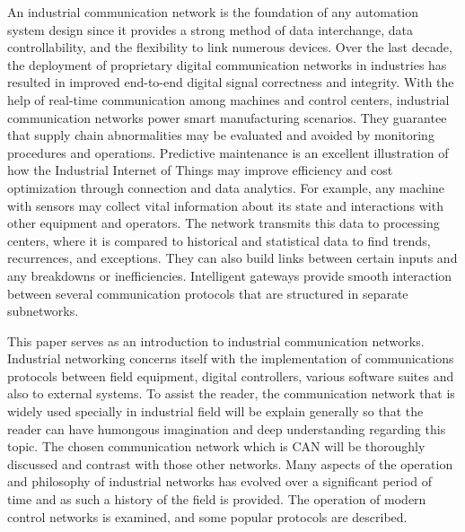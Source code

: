 An industrial communication network is the foundation of any automation system design since it provides a strong method of data interchange, data controllability, and the flexibility to link numerous devices. Over the last decade, the deployment of proprietary digital communication networks in industries has resulted in improved end-to-end digital signal correctness and integrity. With the help of real-time communication among machines and control centers, industrial communication networks power smart manufacturing scenarios. They guarantee that supply chain abnormalities may be evaluated and avoided by monitoring procedures and operations. Predictive maintenance is an excellent illustration of how the Industrial Internet of Things may improve efficiency and cost optimization through connection and data analytics. For example, any machine with sensors may collect vital information about its state and interactions with other equipment and operators. The network transmits this data to processing centers, where it is compared to historical and statistical data to find trends, recurrences, and exceptions. They can also build links between certain inputs and any breakdowns or inefficiencies. Intelligent gateways provide smooth interaction between several communication protocols that are structured in separate subnetworks.

This paper serves as an introduction to industrial communication networks. Industrial networking concerns itself with the implementation of communications protocols between field equipment, digital controllers, various software suites and also to external systems. To assist the reader, the communication network that is widely used specially in industrial field will be explain generally so that the reader can have humongous imagination and deep understanding regarding this topic. The chosen communication network which is CAN will be thoroughly discussed and contrast with those other networks. Many aspects of the operation and philosophy of industrial networks has evolved over a significant period of time and as such a history of the field is provided. The operation of modern control networks is examined, and some popular protocols are described.
